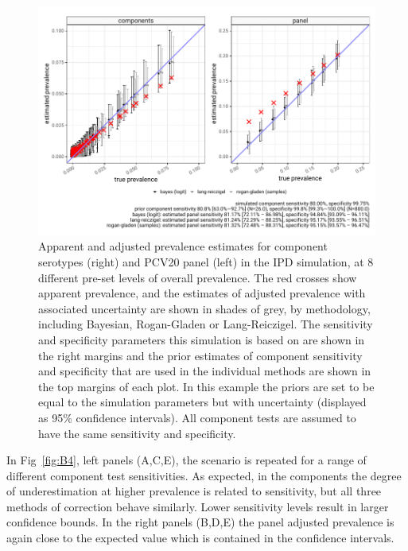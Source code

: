 \documentclass[a4paper, 12pt, twoside]{article}
\begin{document}
\begin{figure}[h!]
\centering
  \includegraphics{fig/simulation_result_sens_80_80_v2}
  \caption{Apparent and adjusted prevalence estimates for component serotypes (right) and PCV20 panel (left) in the IPD simulation, at 8 different pre-set levels of overall prevalence. The red crosses show apparent prevalence, and the estimates of adjusted prevalence with associated uncertainty are shown in shades of grey, by methodology, including Bayesian, Rogan-Gladen or Lang-Reiczigel. The sensitivity and specificity parameters this simulation is based on are shown in the right margins and the prior estimates of component sensitivity and specificity that are used in the individual methods are shown in the top margins of each plot. In this example the priors are set to be equal to the simulation parameters but with uncertainty (displayed as 95\% confidence intervals). All component tests are assumed to have the same sensitivity and specificity.}
\label{fig:B3}
\end{figure}

In Fig~\ref{fig:B4}, left panels (A,C,E), the scenario is repeated for a range of different component test sensitivities. As expected, in the components the degree of underestimation at higher prevalence is related to sensitivity, but all three methods of correction behave similarly. Lower sensitivity levels result in larger confidence bounds. In the right panels (B,D,E) the panel adjusted prevalence is again close to the expected value which is contained in the confidence intervals.
\end{document}
